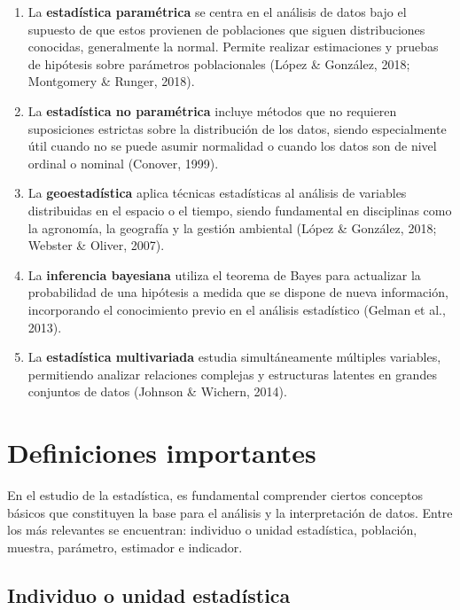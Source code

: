 \documentclass[
  spanish,
  letterpaper,
]{book}
\begin{document}
\begin{enumerate}
\def\labelenumi{\arabic{enumi}.}
\item
  La \textbf{estadística paramétrica} se centra en el análisis de datos
  bajo el supuesto de que estos provienen de poblaciones que siguen
  distribuciones conocidas, generalmente la normal. Permite realizar
  estimaciones y pruebas de hipótesis sobre parámetros poblacionales
  (López \& González, 2018; Montgomery \& Runger, 2018).
\item
  La \textbf{estadística no paramétrica} incluye métodos que no
  requieren suposiciones estrictas sobre la distribución de los datos,
  siendo especialmente útil cuando no se puede asumir normalidad o
  cuando los datos son de nivel ordinal o nominal (Conover, 1999).
\item
  La \textbf{geoestadística} aplica técnicas estadísticas al análisis de
  variables distribuidas en el espacio o el tiempo, siendo fundamental
  en disciplinas como la agronomía, la geografía y la gestión ambiental
  (López \& González, 2018; Webster \& Oliver, 2007).
\item
  La \textbf{inferencia bayesiana} utiliza el teorema de Bayes para
  actualizar la probabilidad de una hipótesis a medida que se dispone de
  nueva información, incorporando el conocimiento previo en el análisis
  estadístico (Gelman et al., 2013).
\item
  La \textbf{estadística multivariada} estudia simultáneamente múltiples
  variables, permitiendo analizar relaciones complejas y estructuras
  latentes en grandes conjuntos de datos (Johnson \& Wichern, 2014).
\end{enumerate}

\section{Definiciones importantes}\label{definiciones-importantes}

En el estudio de la estadística, es fundamental comprender ciertos
conceptos básicos que constituyen la base para el análisis y la
interpretación de datos. Entre los más relevantes se encuentran:
individuo o unidad estadística, población, muestra, parámetro, estimador
e indicador.

\subsection{Individuo o unidad
estadística}\label{individuo-o-unidad-estaduxedstica}
\end{document}
